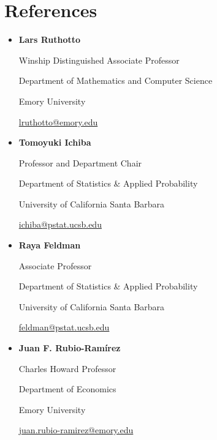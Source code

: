 \documentclass[11pt,a4paper,roman]{moderncv}
\begin{document}
\section{References}
\begin{itemize}
    \item \textbf{Lars Ruthotto}
    
    Winship Distinguished Associate Professor
    
    Department of Mathematics and Computer Science
    
    Emory University

    \url{lruthotto@emory.edu} 
    
    
    \item \textbf{Tomoyuki Ichiba}
    
    Professor and Department Chair
    
    Department of Statistics \& Applied Probability

    
    University of California Santa Barbara

    \url{ichiba@pstat.ucsb.edu}
    
    \item \textbf{Raya Feldman}
    
    Associate Professor
    
    Department of Statistics \& Applied Probability
    
    University of California Santa Barbara

    \url{feldman@pstat.ucsb.edu}

        \item \textbf{Juan F. Rubio-Ram\'{i}rez}
    
    Charles Howard Professor 
    
    Department of Economics
    
    Emory University
    
    \url{juan.rubio-ramirez@emory.edu}





    
\end{itemize}
\end{document}

